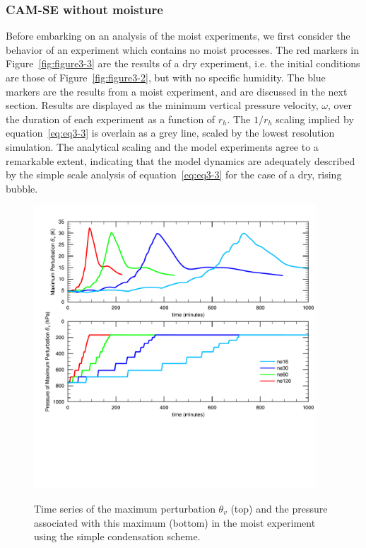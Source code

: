 \subsubsection{CAM-SE without moisture}
Before embarking on an analysis of the moist experiments, we first consider the behavior of an experiment which contains no moist processes. The red markers in Figure~\ref{fig:figure3-3} are the results of a dry experiment, i.e. the initial conditions are those of Figure~\ref{fig:figure3-2}, but with no specific humidity. The blue markers are the results from a moist experiment, and are discussed in the next section. Results are displayed as the minimum vertical pressure velocity, $\omega$, over the duration of each experiment as a function of $r_h$. The $1/r_h$ scaling implied by equation~\ref{eq:eq3-3} is overlain as a grey line, scaled by the lowest resolution simulation. The analytical scaling and the model experiments agree to a remarkable extent, indicating that the model dynamics are adequately described by the simple scale analysis of equation~\ref{eq:eq3-3} for the case of a dry, rising bubble.

\begin{figure}
\begin{center}
\noindent\includegraphics[width=25pc,angle=0]{chapter3/Figure4_crop.pdf}\\
\end{center}
\caption{Time series of the maximum perturbation $\theta_v$ (top) and the pressure associated with this maximum (bottom) in the moist experiment using the simple condensation scheme.}
\label{fig:figure3-4}
\end{figure}

